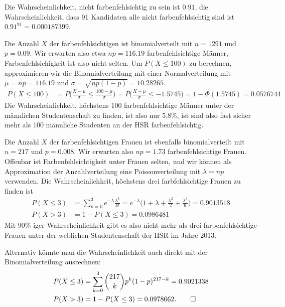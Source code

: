 \begin{loesung}
\begin{teilaufgaben}
\item
Die Wahrscheinlichkeit, nicht farbenfehlsichtig zu sein ist $0.91$, die
Wahrscheinlichkeit, dass 91 Kandidaten alle nicht farbenfehlsichtig sind
ist $0.91^{91}=0.000187399$.
\item
Die Anzahl $X$ der farbenfehlsichtigen ist binomialverteilt mit $n=1291$ und
$p=0.09$. Wir erwarten also etwa $np=116.19$ farbenfehlsichtige Männer,
Farbenfehlsichigkeit ist also nicht selten. Um $P(X\le 100)$ zu
berechnen, approximieren wir die Binomialverteilung mit einer Normalverteilung
mit $\mu=np=116.19$ und $\sigma=\sqrt{np(1-p)}=10.28265$.
\begin{align*}
P(X\le 100)
&=
P\biggl(
\frac{X-\mu}{\sigma}\le \frac{100-\mu}{\sigma}
\biggr)
=
P\biggl(
\frac{X-\mu}{\sigma}\le -1.5745
\biggr)
=
1-\Phi(1.5745)
=
0.0576744
\end{align*}
Die Wahrscheinlichkeit, höchstens 100 farbenfehlsichtige Männer unter
der männlichen Studentenschaft zu finden, ist also nur 5.8\%, ist sind
also fast sicher mehr als 100 männliche Studenten an der HSR
farbenfehlsichtig.
\item
Die Anzahl $X$ der farbenfehlsichtigen Frauen ist ebenfalls binomialverteilt
mit $n=217$ und $p=0.008$. Wir erwarten also $np=1.73$ farbenfehlsichtige
Frauen. Offenbar ist Farbenfehlsichtigkeit unter Frauen selten, und wir
können als Approximation der Anzahlverteilung eine Poissonverteilung mit
$\lambda = np$ verwenden.
Die Wahrscheinlichkeit, höchstens drei farbfehlsichtige Frauen zu finden
ist
\begin{align*}
P(X\le 3)&=\sum_{k=0}^3 e^{-\lambda}\frac{\lambda^k}{k!}=
e^{-\lambda}\biggl(
1+\lambda +\frac{\lambda^2}{2}+\frac{\lambda^3}{6}
\biggr)
=
0.9013518
\\
P(X>3)&=1-P(X\le 3)=
0.0986481
\end{align*}
Mit 90\%-iger Wahrscheinlichkeit gibt es also nicht mehr als drei
farbenfehlsichtige Frauen unter der weblichen Studentenschaft
der HSR im Jahre 2013.

Alternativ könnte man die Wahrscheinlichkeit auch direkt mit der 
Binomialverteilung ausrechnen:
\begin{align*}
P(X\le 3)
&=
\sum_{k=0}^3\binom{217}{k}p^k(1-p)^{217-k}=0.9021338
\\
P(X>3)&=1-P(X\le 3)=0.0978662.
\qedhere
\end{align*}
\end{teilaufgaben}
\end{loesung}

